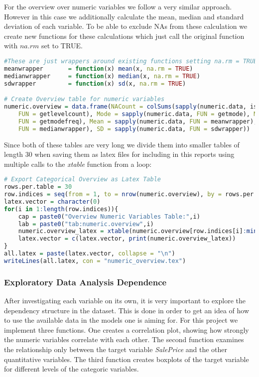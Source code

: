 For the overview over numeric variables we follow a very similar approach. However in this case we additionally calculate the mean, median and standard deviation of each variable. To be able to exclude NAs from these calculation we create new functions for these calculations which just call the original function with $na.rm$ set to TRUE.
\begin{lstlisting}[language=R]
#These are just wrappers around existing functions setting na.rm = TRUE
meanwrapper       = function(x) mean(x, na.rm = TRUE)
medianwrapper     = function(x) median(x, na.rm = TRUE)
sdwrapper         = function(x) sd(x, na.rm = TRUE)

# Create Overview table for numeric variables
numeric.overview = data.frame(NACount = colSums(sapply(numeric.data, is.na)), LevelCount = sapply(numeric.data, 
    FUN = getlevelcount), Mode = sapply(numeric.data, FUN = getmode), ModeFrequency = sapply(numeric.data, 
    FUN = getmodefreq), Mean = sapply(numeric.data, FUN = meanwrapper), Median = sapply(numeric.data, 
    FUN = medianwrapper), SD = sapply(numeric.data, FUN = sdwrapper))
\end{lstlisting} 
Since both of these tables are very long we divide them into smaller tables of length 30 when saving them as latex files for including in this reports using multiple calls to the \textit{xtable} function from a loop:
\begin{lstlisting}[language=R]
# Export Categorical Overview as Latex Table
rows.per.table = 30
row.indices = seq(from = 1, to = nrow(numeric.overview), by = rows.per.table)
latex.vector = character(0)
for(i in 1:length(row.indices)){
    cap = paste0("Overview Numeric Variables Table:",i)
    lab = paste0("tab:numeric.overview",i)
    numeric.overview_latex = xtable(numeric.overview[row.indices[i]:min(row.indices[i] + rows.per.table - 1, nrow(numeric.overview)),,drop = FALSE], caption = cap, label =lab)
    latex.vector = c(latex.vector, print(numeric.overview_latex))
}
all.latex = paste(latex.vector, collapse = "\n")
writeLines(all.latex, con = "numeric_overview.tex")
\end{lstlisting} 


\subsubsection{Exploratory Data Analysis Dependence}
After investigating each variable on its own, it is very important to explore the dependency structure in the dataset. This is done in order to get an idea of how to use the available data in the models one is aiming for. For this project we implement three functions. One creates a correlation plot, showing how strongly the numeric variables correlate with each other. The second function examines the relationship only between the target variable \textit{SalePrice} and the other quantitative variables. The third function creates boxplots of  the target variable for different levels of the categoric variables. 

